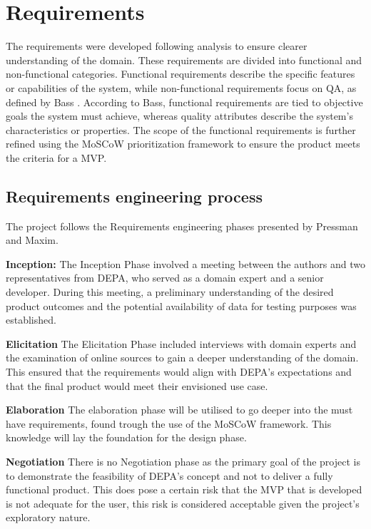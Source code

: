\chapter{Requirements} \label{Requirements}
The requirements were developed following analysis to ensure clearer understanding of the domain. These requirements are divided into functional and non-functional categories. Functional requirements describe the specific features or capabilities of the system, while non-functional requirements focus on \acrfull{QA}, as defined by Bass \cite{bass2021software}. According to Bass, functional requirements are tied to objective goals the system must achieve, whereas quality attributes describe the system's characteristics or properties. The scope of the functional requirements is further refined using the MoSCoW prioritization framework to ensure the product meets the criteria for a \acrfull{MVP}.

\section{Requirements engineering process}\label{SE_Engineering_process}
The project follows the Requirements engineering phases presented by Pressman and Maxim\cite{pressman2019software}.

\textbf{Inception:} The Inception Phase involved a meeting between the authors and two representatives from \acrshort{DEPA}, who served as a domain expert and a senior developer. During this meeting, a preliminary understanding of the desired product outcomes and the potential availability of data for testing purposes was established.

\textbf{Elicitation} The Elicitation Phase included interviews with domain experts and the examination of online sources to gain a deeper understanding of the domain. This ensured that the requirements would align with \acrshort{DEPA}'s expectations and that the final product would meet their envisioned use case. 

\textbf{Elaboration} The elaboration phase will be utilised to go deeper into the must have requirements, found trough the use of the MoSCoW framework. This knowledge will lay the foundation for the design phase. 

\textbf{Negotiation} There is no Negotiation phase as the primary goal of the project is to demonstrate the feasibility of \acrshort{DEPA}'s concept and not to deliver a fully functional product. This does pose a certain risk that the \acrshort{MVP} that is developed is not adequate for the user, this risk is considered acceptable given the project's exploratory nature.

